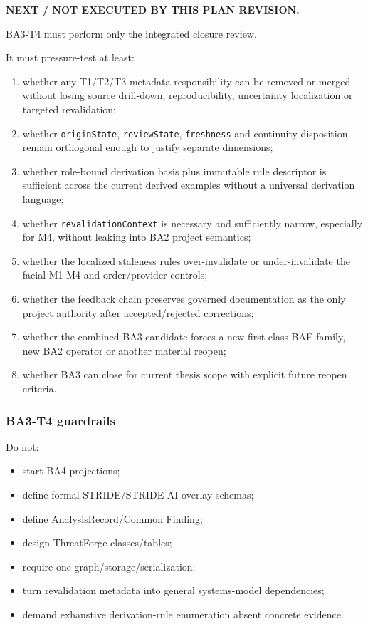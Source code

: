 \documentclass[11pt,a4paper]{article}
\providecommand{\tightlist}{\setlength{\itemsep}{0pt}\setlength{\parskip}{0pt}}
\begin{document}
\textbf{NEXT / NOT EXECUTED BY THIS PLAN REVISION.}

BA3-T4 must perform only the integrated closure review.

It must pressure-test at least:

\begin{enumerate}
\def\labelenumi{\arabic{enumi}.}
\tightlist
\item
  whether any T1/T2/T3 metadata responsibility can be removed or merged
  without losing source drill-down, reproducibility, uncertainty
  localization or targeted revalidation;
\item
  whether \texttt{originState}, \texttt{reviewState}, \texttt{freshness}
  and continuity disposition remain orthogonal enough to justify
  separate dimensions;
\item
  whether role-bound derivation basis plus immutable rule descriptor is
  sufficient across the current derived examples without a universal
  derivation language;
\item
  whether \texttt{revalidationContext} is necessary and sufficiently
  narrow, especially for M4, without leaking into BA2 project semantics;
\item
  whether the localized staleness rules over-invalidate or
  under-invalidate the facial M1-M4 and order/provider controls;
\item
  whether the feedback chain preserves governed documentation as the
  only project authority after accepted/rejected corrections;
\item
  whether the combined BA3 candidate forces a new first-class BAE
  family, new BA2 operator or another material reopen;
\item
  whether BA3 can close for current thesis scope with explicit future
  reopen criteria.
\end{enumerate}

\subsubsection{BA3-T4 guardrails}\label{ba3-t4-guardrails}

Do not:

\begin{itemize}
\tightlist
\item
  start BA4 projections;
\item
  define formal STRIDE/STRIDE-AI overlay schemas;
\item
  define AnalysisRecord/Common Finding;
\item
  design ThreatForge classes/tables;
\item
  require one graph/storage/serialization;
\item
  turn revalidation metadata into general systems-model dependencies;
\item
  demand exhaustive derivation-rule enumeration absent concrete
  evidence.
\end{itemize}
\end{document}
